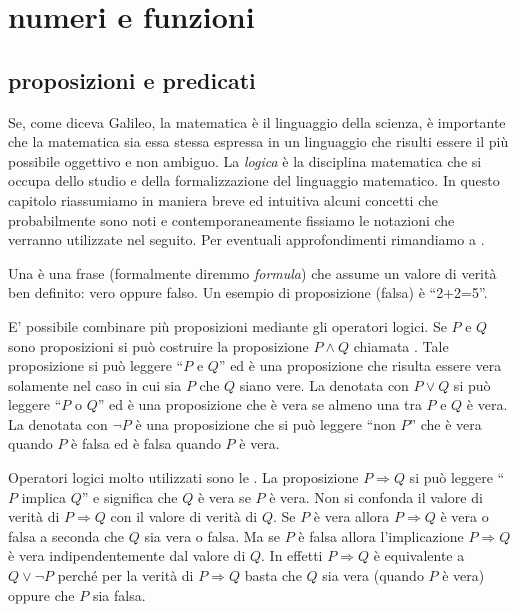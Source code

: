 \chapter{numeri e funzioni}


\section{proposizioni e predicati}

Se, come diceva Galileo, la matematica è il linguaggio della scienza,
è importante che la matematica sia essa stessa espressa in un linguaggio
che risulti essere il più possibile oggettivo e non ambiguo.
La \emph{logica} è la disciplina matematica che si occupa
dello studio e della formalizzazione del linguaggio matematico.
In questo capitolo riassumiamo in maniera breve ed intuitiva
alcuni concetti che probabilmente sono noti e contemporaneamente
fissiamo le notazioni che verranno utilizzate nel seguito.
Per eventuali approfondimenti rimandiamo a \cite{appunti_logica}.

Una 
è una frase (formalmente diremmo \emph{formula})
che assume un valore di verità ben
definito: vero oppure falso.
Un esempio di proposizione (falsa) è ``2+2=5''.

E' possibile combinare più proposizioni mediante
gli operatori logici. Se $P$ e $Q$ sono proposizioni
si può costruire la proposizione $P \land Q$
chiamata .
Tale proposizione
si può leggere ``$P$ e $Q$'' ed è una proposizione
che risulta essere vera solamente nel caso in cui sia
$P$ che $Q$ siano vere.
La  denotata
con $P \lor Q$
si può leggere ``$P$ o $Q$'' ed è una proposizione che
è vera se almeno una tra $P$ e $Q$ è vera.
La  denotata con $\lnot P$ è una
proposizione che si può leggere ``non $P$'' che
è vera quando $P$ è falsa ed è falsa quando $P$ è vera.

Operatori logici molto utilizzati sono le .
La proposizione $P\Rightarrow Q$ si può leggere ``$P$ implica $Q$''
e significa che $Q$ è vera se $P$ è vera. Non si confonda
il valore di verità di $P\Rightarrow Q$ con il valore di verità
di $Q$. Se $P$ è vera allora $P\Rightarrow Q$ è vera o falsa
a seconda che $Q$ sia vera o falsa. Ma se $P$ è falsa allora
l'implicazione $P\Rightarrow Q$ è vera indipendentemente dal
valore di $Q$. In effetti $P\Rightarrow Q$ è equivalente a
$Q \lor \lnot P$ perché per la verità di $P\Rightarrow Q$
basta che $Q$ sia vera (quando $P$ è vera) oppure che $P$ sia falsa.

